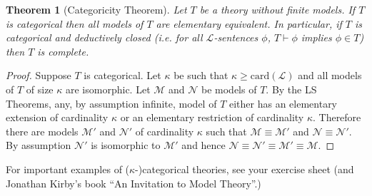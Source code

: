 \documentclass[11pt]{article}
\newcommand{\proves}{\vdash}
\newtheorem{theorem}{Theorem}[section]
\newcommand{\mcal}[1]{\mathcal{#1}}
\begin{document}
\begin{theorem}[Categoricity Theorem]
Let $T$ be a theory without finite models. If $T$ is categorical then all models of $T$ are elementary equivalent. In particular, if $T$ is categorical and deductively closed (i.e. for all $\mcal{L}$-sentences $\phi$, $T\proves \phi$ implies $\phi\in T$) then $T$ is complete.
\end{theorem}
\begin{proof}
Suppose $T$ is categorical. Let $\kappa$ be such that $\kappa\geq \text{card}(\mcal{L})$ and all models of $T$ of size $\kappa$ are isomorphic.  Let $\mcal{M}$ and $\mcal{N}$ be models of $T$. By the LS Theorems, any, by assumption infinite, model of $T$ either has an elementary extension of cardinality $\kappa$ or an elementary restriction of cardinality $\kappa$. Therefore there are models $\mcal{M}'$ and $\mcal{N}'$ of cardinality $\kappa$ such that $\mcal{M}\equiv \mcal{M}'$ and $\mcal{N}\equiv \mcal{N}'$. By assumption $\mcal{N}'$ is isomorphic to $\mcal{M}'$ and hence $\mcal{N}\equiv \mcal{N}'\equiv \mcal{M}'\equiv \mcal{M}$.

\end{proof}

For important examples of ($\kappa$-)categorical theories, see your exercise sheet (and Jonathan Kirby's book ``An Invitation to Model Theory''.)
\end{document}
